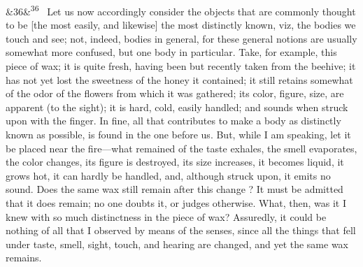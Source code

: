 \documentclass[12pt]{article}
\newcommand{\para}[1][]{\par\noindent\ifx&#1&\else\textsuperscript{\footnotesize #1}~\fi}
\begin{document}
\para[36] Let us now accordingly consider the objects that are commonly thought to be [the most easily, and likewise] the most distinctly known, viz, the bodies we touch and see; not, indeed, bodies in general, for these general notions are usually somewhat more confused, but one body in particular. Take, for example, this piece of wax; it is quite fresh, having been but recently taken from the beehive; it has not yet lost the sweetness of the honey it contained; it still retains somewhat of the odor of the flowers from which it was gathered; its color, figure, size, are apparent (to the sight); it is hard, cold, easily handled; and sounds when struck upon with the finger. In fine, all that contributes to make a body as distinctly known as possible, is found in the one before us. But, while I am speaking, let it be placed near the fire---what remained of the taste exhales, the smell evaporates, the color changes, its figure is destroyed, its size increases, it becomes liquid, it grows hot, it can hardly be handled, and, although struck upon, it emits no sound. Does the same wax still remain after this change ? It must be admitted that it does remain; no one doubts it, or judges otherwise. What, then, was it I knew with so much distinctness in the piece of wax? Assuredly, it could be nothing of all that I observed by means of the senses, since all the things that fell under taste, smell, sight, touch, and hearing are changed, and yet the same wax remains.
\end{document}
